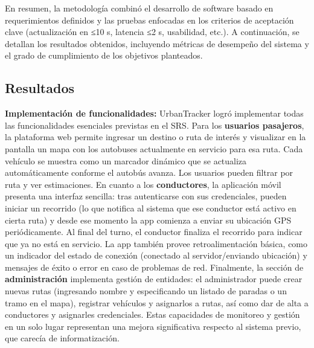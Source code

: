 \documentclass[
]{article}
\begin{document}
En resumen, la metodología combinó el desarrollo de software basado en
requerimientos definidos y las pruebas enfocadas en los criterios de
aceptación clave (actualización en ≤10 s, latencia ≤2 s, usabilidad,
etc.). A continuación, se detallan los resultados obtenidos, incluyendo
métricas de desempeño del sistema y el grado de cumplimiento de los
objetivos planteados.

\subsection{Resultados}\label{resultados}

\textbf{Implementación de funcionalidades:} UrbanTracker logró
implementar todas las funcionalidades esenciales previstas en el SRS.
Para los \textbf{usuarios pasajeros}, la plataforma web permite ingresar
un destino o ruta de interés y visualizar en la pantalla un mapa con los
autobuses actualmente en servicio para esa ruta. Cada vehículo se
muestra como un marcador dinámico que se actualiza automáticamente
conforme el autobús avanza. Los usuarios pueden filtrar por ruta y ver
estimaciones. En cuanto a los \textbf{conductores}, la aplicación móvil
presenta una interfaz sencilla: tras autenticarse con sus credenciales,
pueden iniciar un recorrido (lo que notifica al sistema que ese
conductor está activo en cierta ruta) y desde ese momento la app
comienza a enviar su ubicación GPS periódicamente. Al final del turno,
el conductor finaliza el recorrido para indicar que ya no está en
servicio. La app también provee retroalimentación básica, como un
indicador del estado de conexión (conectado al servidor/enviando
ubicación) y mensajes de éxito o error en caso de problemas de red.
Finalmente, la sección de \textbf{administración} implementa gestión de
entidades: el administrador puede crear nuevas rutas (ingresando nombre
y especificando un listado de paradas o un tramo en el mapa), registrar
vehículos y asignarlos a rutas, así como dar de alta a conductores y
asignarles credenciales. Estas capacidades de monitoreo y gestión en un
solo lugar representan una mejora significativa respecto al sistema
previo, que carecía de informatización.
\end{document}
